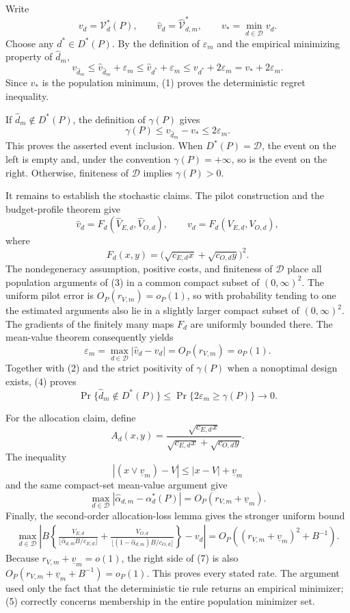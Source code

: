 Write
\[
 v_d=\mathcal V_d^*(P),\qquad
 \widehat v_d=\widehat{\mathcal V}_{d,m}^*,\qquad
 v_*=\min_{d\in\mathcal D}v_d.
\]
Choose any \(d^*\in D^*(P)\).  By the definition of \(\varepsilon_m\) and the empirical minimizing property of \(\widehat d_m\),
\[
 v_{\widehat d_m}
 \leq \widehat v_{\widehat d_m}+\varepsilon_m
 \leq \widehat v_{d^*}+\varepsilon_m
 \leq v_{d^*}+2\varepsilon_m
 =v_*+2\varepsilon_m.                                             \tag{1}
\]
Since \(v_*\) is the population minimum, (1) proves the deterministic regret inequality.

If \(\widehat d_m\notin D^*(P)\), the definition of \(\gamma(P)\) gives
\[
 \gamma(P)\leq v_{\widehat d_m}-v_*\leq2\varepsilon_m.            \tag{2}
\]
This proves the asserted event inclusion.  When \(D^*(P)=\mathcal D\), the event on the left is empty and, under the convention \(\gamma(P)=+\infty\), so is the event on the right.  Otherwise, finiteness of \(\mathcal D\) implies \(\gamma(P)>0\).

It remains to establish the stochastic claims.  The pilot construction and the budget-profile theorem give
\[
 \widehat v_d
 =F_d(\widehat V_{E,d},\widehat V_{O,d}),\qquad
 v_d=F_d(V_{E,d},V_{O,d}),
\]
where
\[
 F_d(x,y)=\bigl(\sqrt{c_{E,d}x}+\sqrt{c_{O,d}y}\bigr)^2.           \tag{3}
\]
The nondegeneracy assumption, positive costs, and finiteness of \(\mathcal D\) place all population arguments of (3) in a common compact subset of \((0,\infty)^2\).  The uniform pilot error is \(O_P(r_{V,m})=o_P(1)\), so with probability tending to one the estimated arguments also lie in a slightly larger compact subset of \((0,\infty)^2\).  The gradients of the finitely many maps \(F_d\) are uniformly bounded there.  The mean-value theorem consequently yields
\[
 \varepsilon_m
 =\max_{d\in\mathcal D}|\widehat v_d-v_d|
 =O_P(r_{V,m})=o_P(1).                                             \tag{4}
\]
Together with (2) and the strict positivity of \(\gamma(P)\) when a nonoptimal design exists, (4) proves
\[
 \Pr\{\widehat d_m\notin D^*(P)\}
 \leq\Pr\{2\varepsilon_m\geq\gamma(P)\}\longrightarrow0.       \tag{5}
\]

For the allocation claim, define
\[
 A_d(x,y)=
 \frac{\sqrt{c_{E,d}x}}
 {\sqrt{c_{E,d}x}+\sqrt{c_{O,d}y}}.
\]
The inequality
\[
 |(x\vee\underline v_m)-V|
 \leq |x-V|+\underline v_m
\]
and the same compact-set mean-value argument give
\[
 \max_{d\in\mathcal D}
 |\widehat\alpha_{d,m}-\alpha_d^*(P)|
 =O_P(r_{V,m}+\underline v_m).                                    \tag{6}
\]
Finally, the second-order allocation-loss lemma gives the stronger uniform bound
\[
\begin{aligned}
 \max_{d\in\mathcal D}\left|B\left\{
 \frac{V_{E,d}}{\lfloor\widehat\alpha_{d,m}B/c_{E,d}\rfloor}
 +\frac{V_{O,d}}{\lfloor(1-\widehat\alpha_{d,m})B/c_{O,d}\rfloor}
 \right\}-v_d\right|
 =O_P\left((r_{V,m}+\underline v_m)^2+B^{-1}\right).
\end{aligned}                                                       \tag{7}
\]
Because \(r_{V,m}+\underline v_m=o(1)\), the right side of (7) is also
\(O_P(r_{V,m}+\underline v_m+B^{-1})=o_P(1)\).  This proves every stated rate.  The argument used only the fact that the deterministic tie rule returns an empirical minimizer; (5) correctly concerns membership in the entire population minimizer set.